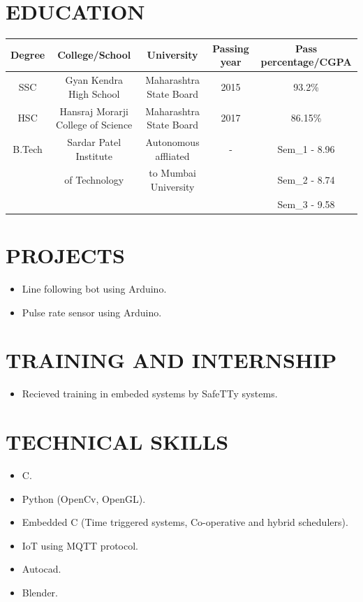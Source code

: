\documentclass{article}
\begin{document}
\section*{\textbf{EDUCATION}}
\begin{tabular}{|c|c|c|c|c|}
\hline
Degree & College/School & University & Passing year & Pass percentage/CGPA\\
\hline
SSC & Gyan Kendra High School & Maharashtra State Board & 2015 & 93.2\%\\
\hline
HSC & Hansraj Morarji College of Science & Maharashtra State Board & 2017 & 86.15\%\\
\hline
B.Tech & Sardar Patel Institute& Autonomous affliated  & - &Sem\_1 - 8.96\\
 & of Technology & to Mumbai University & & Sem\_2 - 8.74\\
&&&&Sem\_3 - 9.58\\
\hline 
\end{tabular}


\section*{\textbf{PROJECTS}}
\begin{itemize}
\item Line following bot using Arduino.
\item Pulse rate sensor using Arduino.
\end{itemize}

\section*{\textbf{TRAINING AND INTERNSHIP}}
\begin{itemize}
\item Recieved training in embeded systems by SafeTTy systems.
\end{itemize}

\section*{\textbf{TECHNICAL SKILLS}}
\begin{itemize}
\item C.
\item Python (OpenCv, OpenGL).
\item Embedded C (Time triggered systems, Co-operative and hybrid schedulers).
\item IoT using MQTT protocol.
\item Autocad.
\item Blender.
\end{itemize}
\end{document}
